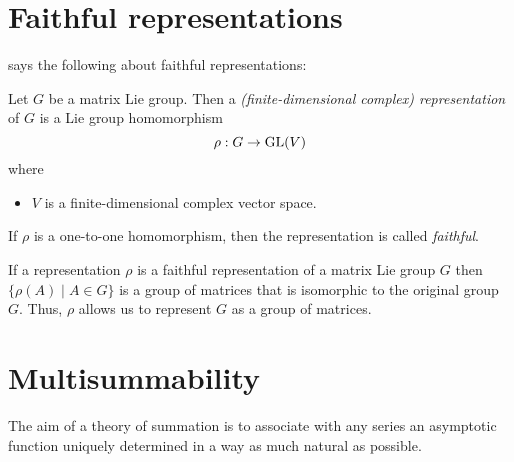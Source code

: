 \section{Faithful representations} \label{sec:faithRepre}
\cite[Def.4.1]{hall2003lie} says the following about faithful representations:
\begin{defn}
  \begin{comment}
    See:
    \begin{itemize}
      \item \cite[Def.4.1]{hall2003lie}
      \item \url{http://nlab.mathforge.org/nlab/show/faithful+representation}
    \end{itemize}
  \end{comment}
  Let $G$ be a matrix\PROBLEM{} Lie group. Then a \emph{(finite-dimensional
  complex) representation} of $G$ is a Lie group homomorphism
  \[
    \rho:G\to\operatorname{GL}(V)
  \]
  where
  \begin{itemize}
    \item $V$ is a finite-dimensional complex vector space.
  \end{itemize}
  If $\rho$ is a one-to-one homomorphism, then the representation is called
  \emph{faithful}.
  \begin{comment}
    \textbf{Other criterion:}
    If the associated homomorphism $G\to\Aut(V)$ is injective, then the
    representation is \emph{faithful}.
  \end{comment}
  \begin{s-rem}
    If a representation $\rho$ is a faithful representation of a matrix Lie
    group $G$ then $\{\rho(A)\mid A\in G\}$ is a group of matrices that is
    isomorphic to the original group $G$. Thus, $\rho$ allows us to represent
    $G$ as a group of matrices.
  \end{s-rem}
\end{defn}

\section{Multisummability}\label{sec:multisummability}
\begin{comment}
  \cite[Sec.III.2]{Loday2014},
  \cite[Chap.6]{Loday2014} and
  \cite[Chap.8]{Loday2014}
\end{comment}
The aim of a theory of summation is  to associate with any series an asymptotic
function uniquely determined in a way as much natural as possible.

